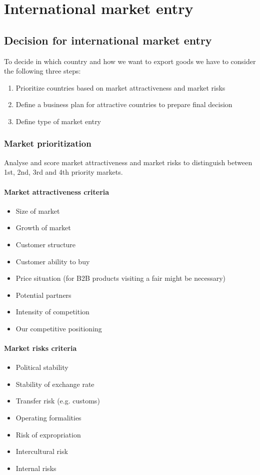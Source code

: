 \section{International market entry}

\subsection{Decision for international market entry}

To decide in which country and how we want to export goods we have to consider the following three steps:

\begin{enumerate}
	\item Prioritize countries based on market attractiveness and market risks
	\item Define a business plan for attractive countries to prepare final decision
	\item Define type of market entry
\end{enumerate}

\subsubsection{Market prioritization}

Analyse and score market attractiveness and market risks to distinguish between 1st, 2nd, 3rd and 4th priority markets.

\paragraph{Market attractiveness criteria}
\begin{itemize}
	\tightlist
	\item Size of market
	\item Growth of market
	\item Customer structure
	\item Customer ability to buy
	\item Price situation (for B2B products visiting a fair might be necessary)
	\item Potential partners
	\item Intensity of competition
	\item Our competitive positioning
\end{itemize}

\paragraph{Market risks criteria}
\begin{itemize}
	\tightlist
	\item Political stability
	\item Stability of exchange rate
	\item Transfer risk (e.g. customs)
	\item Operating formalities
	\item Risk of expropriation
	\item Intercultural risk
	\item Internal risks
\end{itemize}

